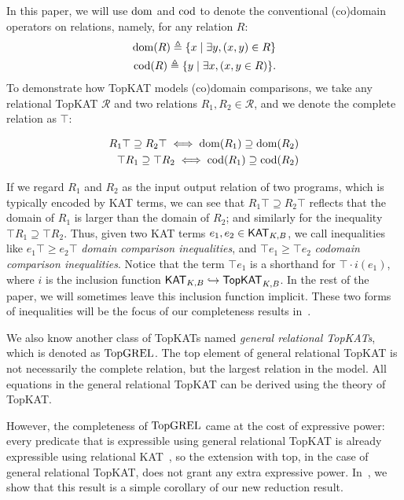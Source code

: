 In this paper, 
we will use \(\operatorname{\mathrm{dom}}\) and \(\operatorname{\mathrm{cod}}\) to denote the 
conventional (co)domain operators on relations, namely, for any relation \(R\):
\begin{align*}
    \operatorname{\mathrm{dom}}(R)  \triangleq  \{x  \mid   \exists  y, (x, y)  \in  R\} \\
    \operatorname{\mathrm{cod}}(R)  \triangleq  \{y  \mid   \exists  x, (x, y  \in  R)\}.
\end{align*}
To demonstrate how TopKAT models (co)domain comparisons,
we take any relational TopKAT \(\mathcal{R}\) and two relations \(R_{1}, R_{2}  \in  \mathcal{R}\),
and we denote the complete relation as \( \top \):
\begin{lemma}\label{the: TopKAT encodes domain PRIMITIVE}
    \begin{align*}
        R_{1}  \top   \supseteq  R_{2}  \top   \iff  \operatorname{\mathrm{dom}}(R_{1})  \supseteq  \operatorname{\mathrm{dom}}(R_{2}) \\
         \top  R_{1}  \supseteq   \top  R_{2}  \iff  \operatorname{\mathrm{cod}}(R_{1})  \supseteq  \operatorname{\mathrm{cod}}(R_{2})
    \end{align*}
\end{lemma}
If we regard \(R_{1}\) and \(R_{2}\) as the input output relation of two programs,
which is typically encoded by KAT terms,
we can see that \(R_{1}  \top   \supseteq  R_{2}  \top \) reflects that  
the domain of \(R_{1}\) is larger than the domain of \(R_{2}\);
and similarly for the inequality \( \top  R_{1}  \supseteq   \top  R_{2}\).
Thus, given two KAT terms \(e_1, e_2  \in  \mathsf{KAT}_{K, B}\), we call inequalities like
\(e_1  \top   \geq  e_2  \top \) \emph{domain comparison inequalities},
and \( \top  e_1  \geq   \top  e_2\) \emph{codomain comparison inequalities}.
Notice that the term \( \top  e_1\) is a shorthand for \( \top   \cdot  i(e_1)\),
where \(i\) is the inclusion function \(\mathsf{KAT}_{K, B}  \hookrightarrow  \mathsf{TopKAT}_{K, B}\).
In the rest of the paper, we will sometimes leave this inclusion function implicit.
These two forms of inequalities will be the focus of 
our completeness results in~.

We also know another class of TopKATs named \emph{general relational TopKATs},
which is denoted as \(\mathbf{\mathrm{TopGREL}}\).
The top element of general relational TopKAT is not necessarily the complete relation,
but the largest relation in the model.
All equations in the general relational TopKAT can be derived using the theory of TopKAT.

However, the completeness of \(\mathbf{\mathrm{TopGREL}}\) came at the cost of expressive power:
every predicate that is expressible using general relational TopKAT 
is already expressible using relational KAT~\cite{Zhang_de_Amorim_Gaboardi_2022},
so the extension with top, in the case of general relational TopKAT, 
does not grant any extra expressive power.
In~, 
we show that this result is a simple corollary of our new reduction result.

